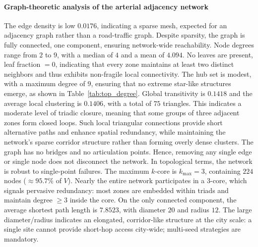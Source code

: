 \paragraph{Graph-theoretic analysis of the arterial adjacency network}
\label{subsec:graph_analysis}
The edge density is low $0.0176$, indicating a sparse mesh, expected for an adjacency graph rather than a road-traffic graph. Despite sparsity, the graph is fully connected, one component, ensuring network-wide reachability.
Node degrees range from $2$ to $9$, with a median of $4$ and a mean of $4.094$. No leaves are present, leaf fraction $=0$, indicating that every zone maintains at least two distinct neighbors and thus exhibits non-fragile local connectivity. The hub set is modest, with a maximum degree of $9$, ensuring that no extreme star-like structures emerge, as shown in Table~\ref{tab:top_degree}.
Global transitivity is $0.1418$ and the average local clustering is $0.1406$, with a total of $75$ triangles. This indicates a moderate level of triadic closure, meaning that some groups of three adjacent zones form closed loops. Such local triangular connections provide short alternative paths and enhance spatial redundancy, while maintaining the network’s sparse corridor structure rather than forming overly dense clusters.
The graph has no bridges and no articulation points. Hence, removing any single edge or single node does not disconnect the network. In topological terms, the network is robust to single-point failures.
The maximum $k$-core is $k_{\max}=3$, containing $224$ nodes ($\approx 95.7\%$ of $V$). Nearly the entire network participates in a 3-core, which signals pervasive redundancy: most zones are embedded within triads and maintain degree $\ge 3$ inside the core.
On the only connected component, the average shortest path length is $7.8523$, with diameter $20$ and radius $12$. The large diameter/radius indicates an elongated, corridor-like structure at the city scale: a single site cannot provide short-hop access city-wide; multi-seed strategies are mandatory.

